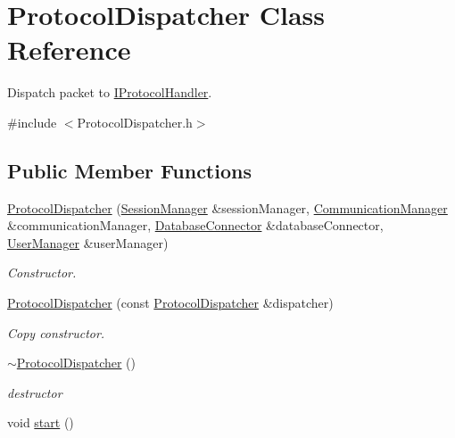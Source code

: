 \hypertarget{class_protocol_dispatcher}{\section{Protocol\-Dispatcher Class Reference}
\label{class_protocol_dispatcher}
}


Dispatch packet to \hyperlink{class_i_protocol_handler}{I\-Protocol\-Handler}.  




{\ttfamily \#include $<$Protocol\-Dispatcher.\-h$>$}

\subsection*{Public Member Functions}
\begin{DoxyCompactItemize}
\item 
\hyperlink{class_protocol_dispatcher_a905f7ef56bc5715db40e8da433c1a321}{Protocol\-Dispatcher} (\hyperlink{class_session_manager}{Session\-Manager} \&session\-Manager, \hyperlink{class_communication_manager}{Communication\-Manager} \&communication\-Manager, \hyperlink{class_database_connector}{Database\-Connector} \&database\-Connector, \hyperlink{class_user_manager}{User\-Manager} \&user\-Manager)
\begin{DoxyCompactList}\small\item\em Constructor. \end{DoxyCompactList}\item 
\hyperlink{class_protocol_dispatcher_aaf829070c0c5cf522a76ec4621c55b8a}{Protocol\-Dispatcher} (const \hyperlink{class_protocol_dispatcher}{Protocol\-Dispatcher} \&dispatcher)
\begin{DoxyCompactList}\small\item\em Copy constructor. \end{DoxyCompactList}\item 
\hypertarget{class_protocol_dispatcher_a72ba7398c45d60a66252d25b22660340}{\hyperlink{class_protocol_dispatcher_a72ba7398c45d60a66252d25b22660340}{$\sim$\-Protocol\-Dispatcher} ()}\label{class_protocol_dispatcher_a72ba7398c45d60a66252d25b22660340}

\begin{DoxyCompactList}\small\item\em destructor \end{DoxyCompactList}\item 
void \hyperlink{class_protocol_dispatcher_a1c2669eee4bfc210221ab9c4a365b820}{start} ()
\end{DoxyCompactItemize}



